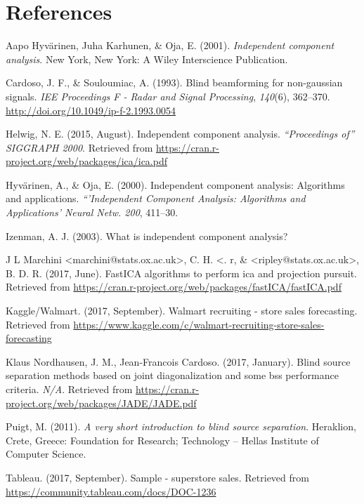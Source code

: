 \documentclass[12pt,twoside]{amherstthesis}
\begin{document}
  \backmatter
  
  \chapter{References}\label{references}
  
  \noindent
  
  \setlength{\parindent}{-0.20in} \setlength{\leftskip}{0.20in}
  \setlength{\parskip}{8pt}
  
  \hypertarget{refs}{}
  \hypertarget{ref-Oja2001}{}
  Aapo Hyvärinen, Juha Karhunen, \& Oja, E. (2001). \emph{Independent
  component analysis}. New York, New York: A Wiley Interscience
  Publication.
  
  \hypertarget{ref-cardoso93}{}
  Cardoso, J. F., \& Souloumiac, A. (1993). Blind beamforming for
  non-gaussian signals. \emph{IEE Proceedings F - Radar and Signal
  Processing}, \emph{140}(6), 362--370.
  \url{http://doi.org/10.1049/ip-f-2.1993.0054}
  
  \hypertarget{ref-icaR}{}
  Helwig, N. E. (2015, August). Independent component analysis.
  \emph{``Proceedings of'' SIGGRAPH 2000}. Retrieved from
  \url{https://cran.r-project.org/web/packages/ica/ica.pdf}
  
  \hypertarget{ref-Oja2000}{}
  Hyvärinen, A., \& Oja, E. (2000). Independent component analysis:
  Algorithms and applications. \emph{``'Independent Component Analysis:
  Algorithms and Applications' Neural Netw. 200}, 411--30.
  
  \hypertarget{ref-izenman2003}{}
  Izenman, A. J. (2003). What is independent component analysis?
  
  \hypertarget{ref-fastICA}{}
  J L Marchini \textless{}marchini@stats.ox.ac.uk\textgreater{}, C. H.
  \textless{}. r, \& \textless{}ripley@stats.ox.ac.uk\textgreater{}, B. D.
  R. (2017, June). FastICA algorithms to perform ica and projection
  pursuit. Retrieved from
  \url{https://cran.r-project.org/web/packages/fastICA/fastICA.pdf}
  
  \hypertarget{ref-walmartdata}{}
  Kaggle/Walmart. (2017, September). Walmart recruiting - store sales
  forecasting. Retrieved from
  \url{https://www.kaggle.com/c/walmart-recruiting-store-sales-forecasting}
  
  \hypertarget{ref-JADE}{}
  Klaus Nordhausen, J. M., Jean-Francois Cardoso. (2017, January). Blind
  source separation methods based on joint diagonalization and some bss
  performance criteria. \emph{N/A}. Retrieved from
  \url{https://cran.r-project.org/web/packages/JADE/JADE.pdf}
  
  \hypertarget{ref-puigt2011}{}
  Puigt, M. (2011). \emph{A very short introduction to blind source
  separation}. Heraklion, Crete, Greece: Foundation for Research;
  Technology -- Hellas Institute of Computer Science.
  
  \hypertarget{ref-storedata}{}
  Tableau. (2017, September). Sample - superstore sales. Retrieved from
  \url{https://community.tableau.com/docs/DOC-1236}


\end{document}
